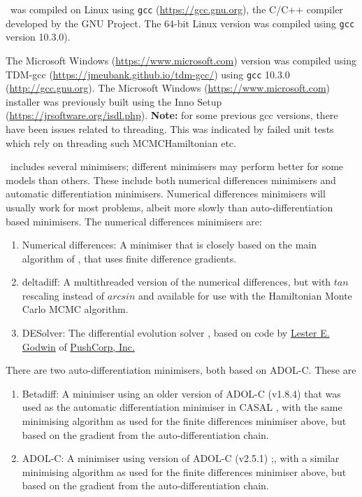 \CNAME\ was compiled on Linux using \texttt{gcc} (\url{https://gcc.gnu.org}), the C/C++ compiler developed by the GNU Project. The 64-bit Linux  version was compiled using \texttt{gcc} version 10.3.0). 

The Microsoft Windows  (\url{https://www.microsoft.com}) version was compiled using TDM-gcc (\url{https://jmeubank.github.io/tdm-gcc/}) using \texttt{gcc} 10.3.0 (\url{http://gcc.gnu.org}). The Microsoft Windows (\url{https://www.microsoft.com}) installer was previously built using the Inno Setup (\url{https://jrsoftware.org/isdl.php}). \textbf{Note:} for some previous gcc versions, there have been issues related to threading. This was indicated by failed unit tests which rely on threading such MCMCHamiltonian etc.

\CNAME\ includes several minimisers; different minimisers may perform better for some models than others. These include both numerical differences minimisers and automatic differentiation minimisers. Numerical differences minimisers will usually work for most problems, albeit more slowly than auto-differentiation based minimisers. The numerical differences minimisers are:

\begin{enumerate}
\item Numerical differences: A minimiser that is closely based on the main algorithm of \cite{779}, that uses finite difference gradients.
\item deltadiff: A multithreaded version of the numerical differences, but with $tan$ rescaling instead of $arcsin$ and available for use with the Hamiltonian Monte Carlo MCMC algorithm.
\item DESolver: The differential evolution solver \citep{1442}, based on code by \href{mailto:<godwin@pushcorp.com>}{Lester E. Godwin} of \href{http://www.pushcorp.com}{PushCorp, Inc.}
\end{enumerate}

There are two auto-differentiation minimisers, both based on ADOL-C. These are
\begin{enumerate}
\item Betadiff: A minimiser using an older version of ADOL-C (v1.8.4) that was used as the automatic differentiation minimiser in CASAL \citep{1388}, with the same minimising algorithm as used for the finite differences minimiser above, but based on the gradient from the auto-differentiation chain.
\item ADOL-C: A minimiser using version of ADOL-C (v2.5.1) \citep{walther1996adolc};, with a similar minimising algorithm as used for the finite differences minimiser above, but based on the gradient from the auto-differentiation chain.
\end{enumerate}

